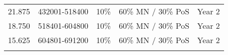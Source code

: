 \documentclass[11pt,a4paperpaper,]{report}
\begin{document}
\begin{longtable}[]{@{}llccc@{}}
\begin{minipage}[t]{0.12\columnwidth}\raggedright\strut
21.875\strut
\end{minipage} & \begin{minipage}[t]{0.19\columnwidth}\raggedright\strut
432001-518400\strut
\end{minipage} & \begin{minipage}[t]{0.14\columnwidth}\centering\strut
10\%\strut
\end{minipage} & \begin{minipage}[t]{0.24\columnwidth}\centering\strut
60\% MN / 30\% PoS\strut
\end{minipage} & \begin{minipage}[t]{0.12\columnwidth}\centering\strut
Year 2\strut
\end{minipage}\tabularnewline
\begin{minipage}[t]{0.12\columnwidth}\raggedright\strut
18.750\strut
\end{minipage} & \begin{minipage}[t]{0.19\columnwidth}\raggedright\strut
518401-604800\strut
\end{minipage} & \begin{minipage}[t]{0.14\columnwidth}\centering\strut
10\%\strut
\end{minipage} & \begin{minipage}[t]{0.24\columnwidth}\centering\strut
60\% MN / 30\% PoS\strut
\end{minipage} & \begin{minipage}[t]{0.12\columnwidth}\centering\strut
Year 2\strut
\end{minipage}\tabularnewline
\begin{minipage}[t]{0.12\columnwidth}\raggedright\strut
15.625\strut
\end{minipage} & \begin{minipage}[t]{0.19\columnwidth}\raggedright\strut
604801-691200\strut
\end{minipage} & \begin{minipage}[t]{0.14\columnwidth}\centering\strut
10\%\strut
\end{minipage} & \begin{minipage}[t]{0.24\columnwidth}\centering\strut
60\% MN / 30\% PoS\strut
\end{minipage} & \begin{minipage}[t]{0.12\columnwidth}\centering\strut
Year 2\strut
\end{minipage}\tabularnewline
\begin{minipage}[t]{0.12\columnwidth}\raggedright\strut

\end{minipage}
\end{longtable}
\end{document}

